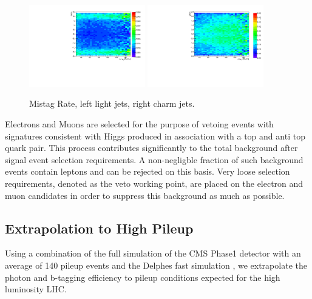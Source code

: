 \documentclass{cmspaper}
\begin{document}
\begin{figure}[h]
  \centering
  \includegraphics[width=0.45\textwidth]{figures/EfficiencyPtEta_LightJetMistag.pdf}
  \includegraphics[width=0.45\textwidth]{figures/EfficiencyPtEta_CharmJetMistag.pdf}
  \caption{Mistag Rate, left light jets, right charm jets.}
  \label{fig:mistagRate}
\end{figure}


Electrons and Muons are selected for the purpose of vetoing events with signatures consistent
with Higgs produced in association with a top and anti top quark pair. This process contributes
significantly to the total background after signal event selection requirements. A non-negligble
fraction of such background events contain leptons and can be rejected on this basis. Very loose
selection requirements, denoted as the veto working point, are placed on the 
electron and muon candidates in order to suppress this background as much as possible. 

\subsection{Extrapolation to High Pileup} 
\label{sec:HighPileupExtrapolation}

Using a combination of the full simulation of the CMS Phase1 detector with an average of 140 pileup events
and the Delphes fast simulation \cite{Delphes}, we extrapolate the photon and b-tagging efficiency to pileup conditions
expected for the high luminosity LHC. 
\end{document}
